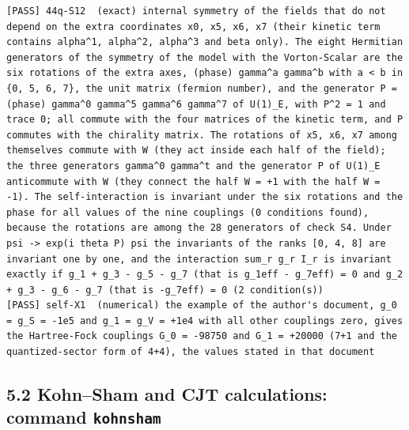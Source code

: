\documentclass[
  10pt,
]{article}
\begin{document}
\begin{verbatim}
[PASS] 44q-S12  (exact) internal symmetry of the fields that do not depend on the extra coordinates x0, x5, x6, x7 (their kinetic term contains alpha^1, alpha^2, alpha^3 and beta only). The eight Hermitian generators of the symmetry of the model with the Vorton-Scalar are the six rotations of the extra axes, (phase) gamma^a gamma^b with a < b in {0, 5, 6, 7}, the unit matrix (fermion number), and the generator P = (phase) gamma^0 gamma^5 gamma^6 gamma^7 of U(1)_E, with P^2 = 1 and trace 0; all commute with the four matrices of the kinetic term, and P commutes with the chirality matrix. The rotations of x5, x6, x7 among themselves commute with W (they act inside each half of the field); the three generators gamma^0 gamma^t and the generator P of U(1)_E anticommute with W (they connect the half W = +1 with the half W = -1). The self-interaction is invariant under the six rotations and the phase for all values of the nine couplings (0 conditions found), because the rotations are among the 28 generators of check S4. Under psi -> exp(i theta P) psi the invariants of the ranks [0, 4, 8] are invariant one by one, and the interaction sum_r g_r I_r is invariant exactly if g_1 + g_3 - g_5 - g_7 (that is g_1eff - g_7eff) = 0 and g_2 + g_3 - g_6 - g_7 (that is -g_7eff) = 0 (2 condition(s))
[PASS] self-X1  (numerical) the example of the author's document, g_0 = g_S = -1e5 and g_1 = g_V = +1e4 with all other couplings zero, gives the Hartree-Fock couplings G_0 = -98750 and G_1 = +20000 (7+1 and the quantized-sector form of 4+4), the values stated in that document
\end{verbatim}

\hypertarget{kohnsham-and-cjt-calculations-command-kohnsham}{%
\subsection{\texorpdfstring{5.2 Kohn--Sham and CJT calculations: command
\texttt{kohnsham}}{5.2 Kohn--Sham and CJT calculations: command kohnsham}}\label{kohnsham-and-cjt-calculations-command-kohnsham}}
\end{document}
